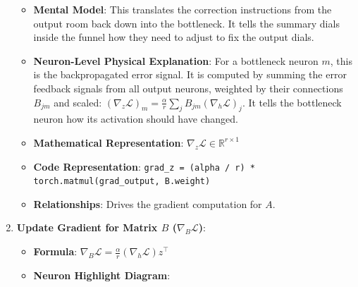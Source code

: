 \begin{enumerate}
\begin{itemize}
      \item \textbf{Mental Model}: This translates the correction instructions from the output room back down into the bottleneck. It tells the summary dials inside the funnel how they need to adjust to fix the output dials.
      \item \textbf{Neuron-Level Physical Explanation}: For a bottleneck neuron $m$, this is the backpropagated error signal. It is computed by summing the error feedback signals from all output neurons, weighted by their connections $B_{jm}$ and scaled: $(\nabla_z \mathcal{L})_m = \frac{\alpha}{r} \sum_j B_{jm} (\nabla_h \mathcal{L})_j$. It tells the bottleneck neuron how its activation should have changed.
      \item \textbf{Mathematical Representation}: $\nabla_z \mathcal{L} \in \mathbb{R}^{r \times 1}$
      \item \textbf{Code Representation}: \texttt{grad\_z = (alpha / r) * torch.matmul(grad\_output, B.weight)}
      \item \textbf{Relationships}: Drives the gradient computation for $A$.
    \end{itemize}

  \item \textbf{Update Gradient for Matrix $B$ ($\nabla_B \mathcal{L}$)}:
    \begin{itemize}
      \item \textbf{Formula}: $\nabla_B \mathcal{L} = \frac{\alpha}{r} (\nabla_h \mathcal{L}) z^\top$
      \item \textbf{Neuron Highlight Diagram}:

\begin{center}
\begin{adjustbox}{max width=0.85\linewidth}
\end{adjustbox}
\end{center}
\end{itemize}
\end{enumerate}
